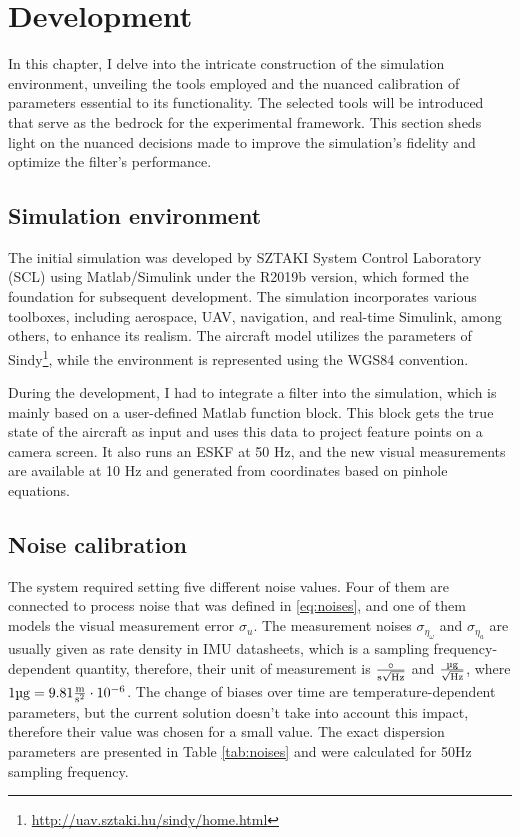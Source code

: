 \chapter{Development}
\label{chap:dev}

In this chapter, I delve into the intricate construction of the simulation environment, unveiling the tools employed and the nuanced calibration of parameters essential to its functionality. The selected tools will be introduced that serve as the bedrock for the experimental framework. This section sheds light on the nuanced decisions made to improve the simulation's fidelity and optimize the filter's performance. 

\section{Simulation environment}

The initial simulation was developed by SZTAKI System Control Laboratory (SCL) using Matlab/Simulink under the R2019b version, which formed the foundation for subsequent development. The simulation incorporates various toolboxes, including aerospace, UAV, navigation, and real-time Simulink, among others, to enhance its realism. The aircraft model utilizes the parameters of Sindy\footnote{\url{http://uav.sztaki.hu/sindy/home.html}}, while the environment is represented using the WGS84 convention.

During the development, I had to integrate a filter into the simulation, which is mainly based on a user-defined Matlab function block. This block gets the true state of the aircraft as input and uses this data to project feature points on a camera screen. It also runs an ESKF at 50 \si{\hertz}, and the new visual measurements are available at 10 \si{\hertz} and generated from coordinates based on pinhole equations.

\section{Noise calibration}

The system required setting five different noise values. Four of them are connected to process noise that was defined in \eqref{eq:noises}, and one of them models the visual measurement error $\sigma_u$. The measurement noises $\sigma_{\eta_\omega}$ and $\sigma_{\eta_a}$ are usually given as rate density in IMU datasheets, which is a sampling frequency-dependent quantity, therefore, their unit of measurement is $\si{\frac{\circ}{\second\sqrt{\hertz}}}$ and $\si{\frac{\micro g}{\sqrt{\hertz}}}$, where $1\si{\micro g}=9.81\si{\frac{\meter}{\second\squared}}\cdot 10^{-6}$. The change of biases over time are temperature-dependent parameters, but the current solution doesn't take into account this impact, therefore their value was chosen for a small value. The exact dispersion parameters are presented in Table \ref{tab:noises} and were calculated for 50\si{\hertz} sampling frequency.

